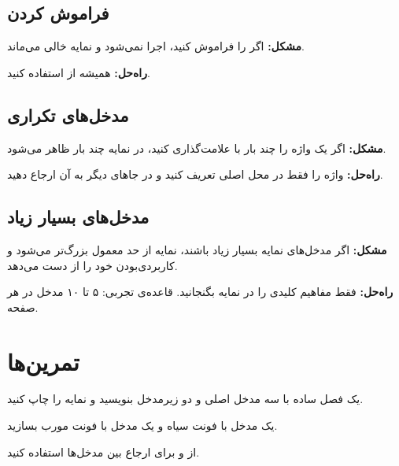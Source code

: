 \subsection{فراموش کردن }
\label{sec:index-mistake-shellescape}

\textbf{مشکل:} اگر  را
فراموش کنید،  اجرا نمی‌شود و نمایه
خالی می‌ماند.

\textbf{راه‌حل:} همیشه از
 استفاده کنید.

\subsection{مدخل‌های تکراری}
\label{sec:index-mistake-duplicate}

\textbf{مشکل:} اگر یک واژه را چند بار با
 علامت‌گذاری کنید، در نمایه چند
بار ظاهر می‌شود.

\textbf{راه‌حل:} واژه را فقط در محل اصلی
تعریف کنید و در جاهای دیگر به آن ارجاع دهید.

\subsection{مدخل‌های بسیار زیاد}
\label{sec:index-mistake-toomany}

\textbf{مشکل:} اگر مدخل‌های نمایه بسیار زیاد
باشند، نمایه از حد معمول بزرگ‌تر می‌شود و
کاربردی‌بودن خود را از دست می‌دهد.

\textbf{راه‌حل:} فقط مفاهیم کلیدی را در نمایه
بگنجانید. قاعده‌ی تجربی: ۵ تا ۱۰ مدخل در هر
صفحه.

\section{تمرین‌ها}
\label{sec:index-exercises}

\begin{exercise}
    یک فصل ساده با سه مدخل اصلی و دو زیرمدخل
    بنویسید و نمایه را چاپ کنید.
    \label{exc:index-basic}
\end{exercise}

\begin{exercise}
    یک مدخل با فونت سیاه و یک مدخل با فونت
    مورب بسازید.
    \label{exc:index-bold}
\end{exercise}

\begin{exercise}
    از  و  برای
    ارجاع بین مدخل‌ها استفاده کنید.
    \label{exc:index-see}
\end{exercise}

